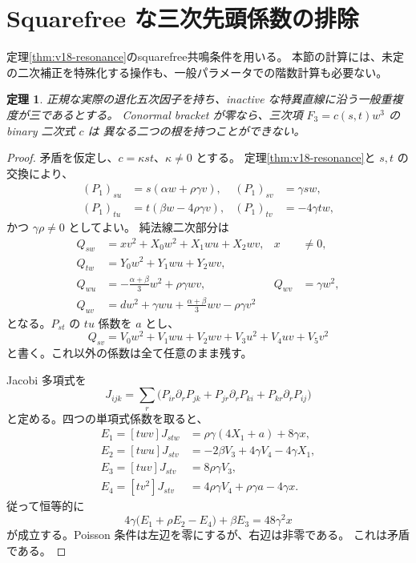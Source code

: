 \documentclass[11pt,a4paper]{ltjsarticle}
\newtheorem{theorem}{定理}[section]
\theoremstyle{remark}\newtheorem{remark}[theorem]{注意}
\begin{document}
\section{Squarefree な三次先頭係数の排除}
\label{sec:v19-squarefree}

定理\ref{thm:v18-resonance}のsquarefree共鳴条件を用いる。
本節の計算には、未定の二次補正を特殊化する操作も、一般パラメータでの階数計算も必要ない。

\begin{theorem}\label{thm:v19-squarefree}
正規な実際の退化五次因子を持ち、inactive な特異直線に沿う一般重複度が三であるとする。
Conormal bracket が零なら、三次項 $F_3=c(s,t)w^3$ の binary 二次式 $c$ は
異なる二つの根を持つことができない。
\end{theorem}

\begin{proof}
矛盾を仮定し、$c=\kappa st$、$\kappa\ne0$ とする。
定理\ref{thm:v18-resonance}と $s,t$ の交換により、
\begin{align*}
 (P_1)_{su}&=s(\alpha w+\rho\gamma v),&
 (P_1)_{sv}&=\gamma sw,\\
 (P_1)_{tu}&=t(\beta w-4\rho\gamma v),&
 (P_1)_{tv}&=-4\gamma tw,
\end{align*}
かつ $\gamma\rho\ne0$ としてよい。
純法線二次部分は
\begin{align*}
 Q_{sw}&=xv^2+X_0w^2+X_1wu+X_2wv,& x&\ne0,\\
 Q_{tw}&=Y_0w^2+Y_1wu+Y_2wv,\\
 Q_{wu}&=-\frac{\alpha+\beta}{3}w^2+\rho\gamma wv,&
 Q_{wv}&=\gamma w^2,\\
 Q_{uv}&=dw^2+\gamma wu+\frac{\alpha+\beta}{3}wv-\rho\gamma v^2
\end{align*}
となる。$P_{st}$ の $tu$ 係数を $a$ とし、
\[
 Q_{sv}=V_0w^2+V_1wu+V_2wv+V_3u^2+V_4uv+V_5v^2
\]
と書く。これ以外の係数は全て任意のまま残す。

Jacobi 多項式を
\[
 J_{ijk}=\sum_r\bigl(P_{ir}\partial_rP_{jk}
                  +P_{jr}\partial_rP_{ki}
                  +P_{kr}\partial_rP_{ij}\bigr)
\]
と定める。四つの単項式係数を取ると、
\begin{align*}
 E_1=[twv]J_{stw}&=\rho\gamma(4X_1+a)+8\gamma x,\\
 E_2=[twu]J_{stv}&=-2\beta V_3+4\gamma V_4-4\gamma X_1,\\
 E_3=[tuv]J_{stv}&=8\rho\gamma V_3,\\
 E_4=[tv^2]J_{stv}&=4\rho\gamma V_4+\rho\gamma a-4\gamma x.
\end{align*}
従って恒等的に
\begin{equation}\label{eq:v19-squarefree-certificate}
 4\gamma\bigl(E_1+\rho E_2-E_4\bigr)+\beta E_3
                      =48\gamma^2x
\end{equation}
が成立する。Poisson 条件は左辺を零にするが、右辺は非零である。
これは矛盾である。
\end{proof}
\end{document}

